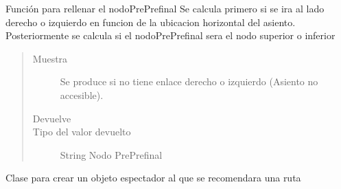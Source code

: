 \documentclass[letterpaper,10pt,spanish]{sphinxmanual}
\begin{document}
\begin{fulllineitems}

\begin{fulllineitems}
\label{\detokenize{Clases:Clases.Asiento.nodoPrePreFinal}}
\sphinxAtStartPar
Función para rellenar el nodoPrePrefinal
Se calcula primero si se ira al lado derecho o izquierdo en funcion de la ubicacion horizontal del asiento.
Posteriormente se calcula si el nodoPrePrefinal sera el nodo superior o inferior
\begin{quote}\begin{description}
\item[{Muestra}] \leavevmode
\sphinxAtStartPar
{} \textendash{} Se produce si no tiene enlace derecho o izquierdo (Asiento no accesible).

\item[{Devuelve}] \leavevmode
\sphinxAtStartPar


\item[{Tipo del valor devuelto}] \leavevmode
\sphinxAtStartPar
String \sphinxhyphen{} Nodo PrePrefinal

\end{description}\end{quote}

\end{fulllineitems}


\end{fulllineitems}


\begin{fulllineitems}
\label{\detokenize{Clases:Clases.Espectador}}
\sphinxAtStartPar
Clase para crear un objeto espectador al que se recomendara una ruta

\end{fulllineitems}

\end{document}

